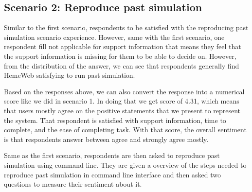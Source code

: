 \subsection{Scenario 2: Reproduce past simulation}

\vspace{0.5cm}

\noindent%
\begin{minipage}{\linewidth}%
 \label{fig:survey-s2-usability}%
\end{minipage}
\vspace{0.5cm}

Similar to the first scenario, respondents to be satisfied with the reproducing past simulation scenario experience.  However, same with the first scenario, one respondent fill not applicable for support information that means they feel that the support information is missing for them to be able to decide on. However, from the distribution of the answer, we can see that respondents generally find HemeWeb satisfying to run past simulation.

Based on the responses above, we can also convert the response into a numerical score like we did in scenario 1. In doing that we get score of 4.31, which means that users mostly agree on the positive statements that we present to represent the system. That respondent is satisfied with support information, time to complete, and the ease of completing task. With that score, the overall sentiment is that respondents answer between agree and strongly agree mostly.

Same as the first scenario, respondents are then asked to reproduce past simulation using command line. They are given a overview of the steps needed to reproduce past simulation in command line interface and then asked two questions to measure their sentiment about it.

